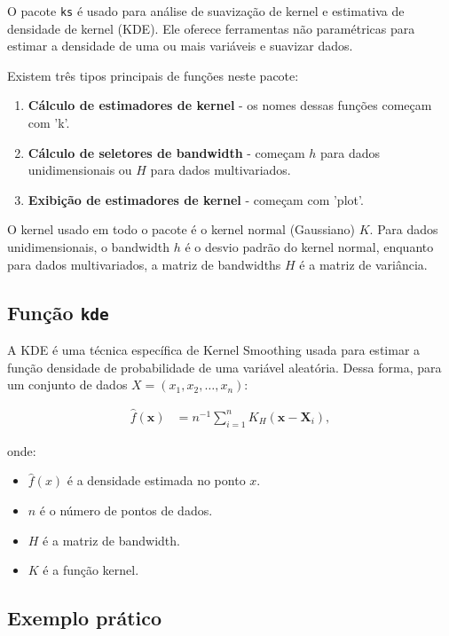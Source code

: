 \documentclass[
  a4paperpaper,
]{article}
\begin{document}
O pacote \texttt{ks} é usado para análise de suavização de kernel e
estimativa de densidade de kernel (KDE). Ele oferece ferramentas não
paramétricas para estimar a densidade de uma ou mais variáveis e
suavizar dados.

Existem três tipos principais de funções neste pacote:

\begin{enumerate}
    \item \textbf{Cálculo de estimadores de kernel} - os nomes dessas funções começam com 'k'.
    \item \textbf{Cálculo de seletores de bandwidth} - começam $h$ para dados unidimensionais ou $H$ para dados multivariados.
    \item \textbf{Exibição de estimadores de kernel} - começam com 'plot'.
\end{enumerate}

O kernel usado em todo o pacote é o kernel normal (Gaussiano) \(K\).
Para dados unidimensionais, o bandwidth \(h\) é o desvio padrão do
kernel normal, enquanto para dados multivariados, a matriz de bandwidths
\(H\) é a matriz de variância.

\subsection{\texorpdfstring{Função
\texttt{kde}}{Função kde}}\label{funuxe7uxe3o-kde}

A KDE é uma técnica específica de Kernel Smoothing usada para estimar a
função densidade de probabilidade de uma variável aleatória. Dessa
forma, para um conjunto de dados \(X = (x_1, x_2, \ldots, x_n)\):

\begin{align}
\hat{f}(\mathbf{x}) &= n^{-1} \sum_{i=1}^{n} K_H(\mathbf{x} - \mathbf{X}_i),
\end{align}

onde:

\begin{itemize}
    \item $\hat{f}(x)$ é a densidade estimada no ponto $x$.
    \item $n$ é o número de pontos de dados.
    \item $H$ é a matriz de bandwidth.
    \item $K$ é a função kernel.
\end{itemize}

\subsection{Exemplo prático}\label{exemplo-pruxe1tico}
\end{document}
